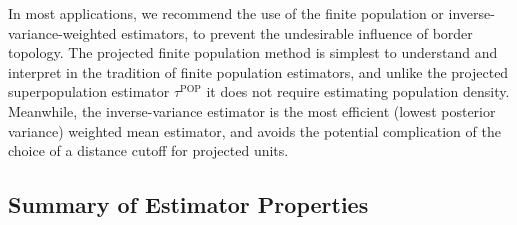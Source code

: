 \documentclass[letter]{article}
\newcommand{\taupop}{\tau^{\mathrm{POP}}}
\begin{document}
In most applications, we recommend the use of the finite population or inverse-variance-weighted estimators, to prevent the undesirable influence of border topology.
The projected finite population method is simplest to understand and interpret in the tradition of finite population estimators, and unlike the projected superpopulation estimator \(\taupop\) it does not require estimating population density.
Meanwhile, the inverse-variance estimator is the most efficient (lowest posterior variance) weighted mean estimator,
and avoids the potential complication of the choice of a distance cutoff for projected units.
    


    	\subsection{Summary of Estimator Properties}\label{summary-of-estimator-properties}
\end{document}
